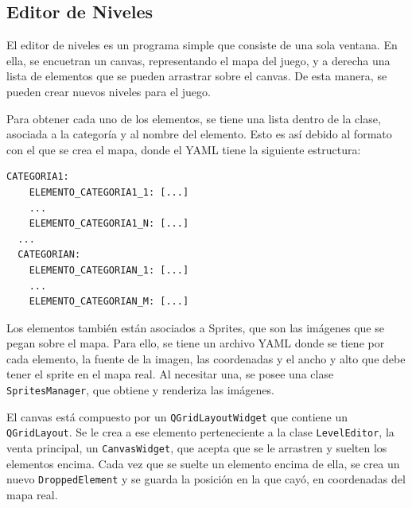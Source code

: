 \documentclass[titlepage,a4paper]{article}
\begin{document}
\subsection{Editor de Niveles}
El editor de niveles es un programa simple que consiste de una sola ventana. En ella, se encuetran un canvas, representando el mapa del juego, y a derecha una lista de elementos que se pueden arrastrar sobre el canvas. De esta manera, se pueden crear nuevos niveles para el juego.

Para obtener cada uno de los elementos, se tiene una lista dentro de la clase, asociada a la categoría y al nombre del elemento. Esto es así debido al formato con el que se crea el mapa, donde el YAML tiene la siguiente estructura:

\begin{lstlisting}[captionpos=b, caption=Ejemplo de formato YAML del mapa]
  CATEGORIA1:
    ELEMENTO_CATEGORIA1_1: [...]
    ...
    ELEMENTO_CATEGORIA1_N: [...]
  ...
  CATEGORIAN:
    ELEMENTO_CATEGORIAN_1: [...]
    ...
    ELEMENTO_CATEGORIAN_M: [...] 
\end{lstlisting}

Los elementos también están asociados a Sprites, que son las imágenes que se pegan sobre el mapa. Para ello, se tiene un archivo YAML donde se tiene por cada elemento, la fuente de la imagen, las coordenadas y el ancho y alto que debe tener el sprite en el mapa real. Al necesitar una, se posee una clase \texttt{SpritesManager}, que obtiene y renderiza las imágenes.

El canvas está compuesto por un \texttt{QGridLayoutWidget} que contiene un \texttt{QGridLayout}. Se le crea a ese elemento perteneciente a la clase \texttt{LevelEditor}, la venta principal, un \texttt{CanvasWidget}, que acepta que se le arrastren y suelten los elementos encima. Cada vez que se suelte un elemento encima de ella, se crea un nuevo \texttt{DroppedElement} y se guarda la posición en la que cayó, en coordenadas del mapa real.
\end{document}
